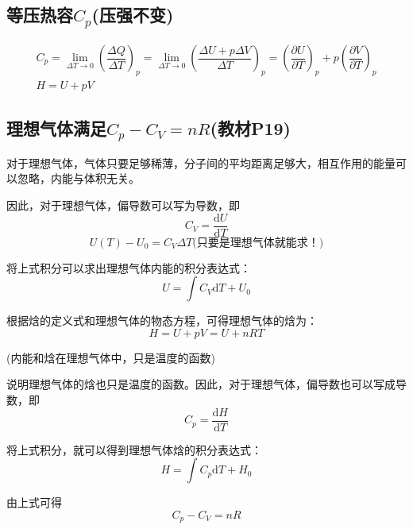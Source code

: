 \documentclass[oneside]{ctexbook}
\begin{document}
\subsection{等压热容\(C_p\)(压强不变)}
\begin{gather*}
    C_p=\lim_{\Delta{}T\to0}\left(\dfrac{\Delta{}Q}{\Delta{}T}\right)_p=\lim_{\Delta{}T\to0}\left(\dfrac{\Delta{}U+p\Delta{}V}{\Delta{}T}\right)_p=\left(\dfrac{\partial{}U}{\partial{}T}\right)_p+p\left(\dfrac{\partial{}V}{\partial{}T}\right)_p\\
    H=U+pV
\end{gather*}

\subsection{理想气体满足\(C_p-C_V=nR\)(教材P19)}

对于理想气体，气体只要足够稀薄，分子间的平均距离足够大，相互作用的能量可以忽略，内能与体积无关。

因此，对于理想气体，偏导数可以写为导数，即
\begin{equation}
C_V=\dfrac{\mathrm{d}U}{\mathrm{d}T}
\end{equation}
\begin{equation}
U(T)-U_0=C_V\Delta{}T\text{(只要是理想气体就能求！)}
\end{equation}

将上式积分可以求出理想气体内能的积分表达式：
\begin{equation}
U=\int{}C_V\mathrm{d}T+U_0
\end{equation}

根据焓的定义式和理想气体的物态方程，可得理想气体的焓为：
\begin{equation}
H=U+pV=U+nRT
\end{equation}

\begin{center}
    (内能和焓在理想气体中，只是温度的函数)
\end{center}

说明理想气体的焓也只是温度的函数。因此，对于理想气体，偏导数也可以写成导数，即
\begin{equation}
C_p=\dfrac{\mathrm{d}H}{\mathrm{d}T}
\end{equation}

将上式积分，就可以得到理想气体焓的积分表达式：
\begin{equation}
H=\int{}C_p\mathrm{d}T+H_0
\end{equation}

由上式可得
\begin{equation}
C_p-C_V=nR
\end{equation}
\end{document}
